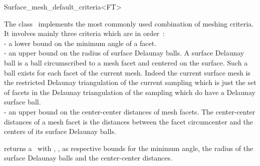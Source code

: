 

\begin{ccRefClass}{Surface_mesh_default_criteria<FT>}  %


\ccDefinition
  
The class \ccRefName\  implements  the most commonly used combination
of meshing criteria. It involves mainly three criteria which are
in order~: \\
- a lower bound on the minimum angle of a facet. \\
- an upper bound on the radius of surface Delaunay balls.
 A surface Delaunay ball is a  ball circumscribed to a mesh facet 
and  centered on the surface. Such a ball exists for each facet
of the current mesh.
Indeed  the current surface mesh
is  the restricted Delaunay triangulation of the current sampling
which is just the set of facets in the Delaunay triangulation of
the sampling  which do have a Delaunay surface ball. \\
- an upper bound on the center-center distances of mesh facets.
  The center-center distances of a mesh facet 
  is the distances between the facet circumcenter and the 
 centers of its  surface Delaunay balls. 



\ccIsModel




\ccCreation
{}  %

{returns a \ccRefName\ with , ,
 as respective bounds for the minimum angle,
the radius of the surface Delaunay balls 
and the center-center distances.}



\end{ccRefClass}
